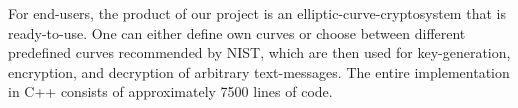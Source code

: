 \documentclass[11pt,english]{article}
\begin{document}
For end-users, the product of our project is an elliptic-curve-cryptosystem that is ready-to-use. One can either define own curves or choose between different predefined curves recommended by NIST, which are then used for key-generation, encryption, and decryption of arbitrary text-messages. The entire implementation in C++ consists of approximately 7500 lines of code.

\newpage


\end{document}
